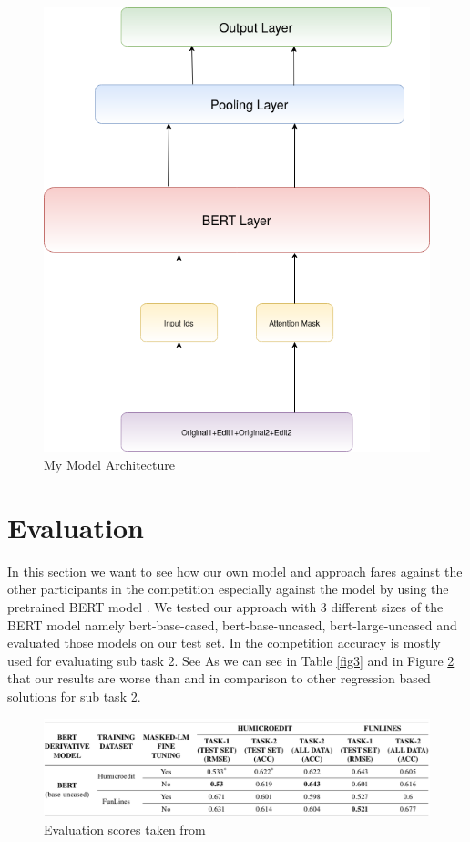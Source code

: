 \documentclass[11pt,a4paper,onecolumn,oneside,notitlepage]{article}
\begin{document}
	\begin{figure}[htb!]
		\begin{center}
		\includegraphics[width=0.5\linewidth]{My_Model_Architecture.png}
			
		\end{center}
		
		\caption{My Model Architecture}\label{fig2}
	\end{figure}
		


		
	\section{Evaluation}
    In this section we want to see how our own model and approach fares against the other participants in the competition especially against the model by \textcite{Bert1} using the pretrained BERT model .
    We tested our approach with 3 different sizes of the BERT model namely bert-base-cased, bert-base-uncased, bert-large-uncased and evaluated those models on our test set. In the competition accuracy is mostly used for evaluating sub task 2. See \textcite{Bert2}
    As we can see in Table \ref{fig3} and in Figure \ref{tab2} that our results are worse than \textcite{Bert1} and in comparison to other regression based solutions for sub task 2.
		
		
	\begin{figure}[htb!]
	\begin{center}
		\includegraphics[width=1.0\linewidth]{eval_tab_edited2.png}
		
	\end{center}
	
	\caption{Evaluation scores taken from \textcite{Bert1}}\label{tab2}
\end{figure}
\end{document}
